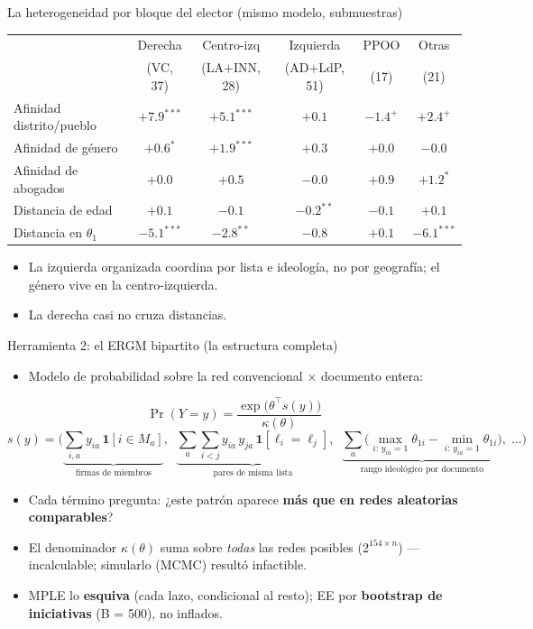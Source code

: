 \documentclass[aspectratio=169,11pt]{beamer}
\newcommand{\emphr}[1]{{\color{ndreddark}\textbf{#1}}}
\begin{document}
\begin{frame}{La heterogeneidad por bloque del elector (mismo modelo, submuestras)}
\begin{center}\footnotesize
\begin{tabular}{lccccc}
\toprule
 & Derecha & Centro-izq & Izquierda & PPOO & Otras \\
 & (VC, 37) & (LA+INN, 28) & (AD+LdP, 51) & (17) & (21) \\
\midrule
Afinidad distrito/pueblo & $+7.9^{***}$ & $+5.1^{***}$ & $+0.1$ & $-1.4^{+}$ & $+2.4^{+}$ \\
Afinidad de género & $+0.6^{*}$ & $+1.9^{***}$ & $+0.3$ & $+0.0$ & $-0.0$ \\
Afinidad de abogados & $+0.0$ & $+0.5$ & $-0.0$ & $+0.9$ & $+1.2^{*}$ \\
Distancia de edad & $+0.1$ & $-0.1$ & $-0.2^{**}$ & $-0.1$ & $+0.1$ \\
Distancia en $\theta_1$ & $-5.1^{***}$ & $-2.8^{**}$ & $-0.8$ & $+0.1$ & $-6.1^{***}$ \\
\bottomrule
\end{tabular}
\end{center}
\vspace{0.25cm}
\begin{itemize}
  \item La izquierda organizada coordina por lista e ideología, no por geografía; el género vive en la centro-izquierda.
  \item La derecha casi no cruza distancias.
\end{itemize}
\end{frame}

\begin{frame}{Herramienta 2: el ERGM bipartito (la estructura completa)}
\begin{itemize}
  \item Modelo de probabilidad sobre la red convencional $\times$ documento entera:
\end{itemize}
$$\Pr(Y = y) = \frac{\exp\big(\theta^\top s(y)\big)}{\kappa(\theta)}$$
{\footnotesize
$$s(y) = \Big(\underbrace{\sum_{i,a} y_{ia}\,\mathbf{1}[i \in M_a]}_{\text{firmas de miembros}},\;\;
\underbrace{\sum_{a}\sum_{i<j} y_{ia}\,y_{ja}\,\mathbf{1}[\ell_i = \ell_j]}_{\text{pares de misma lista}},\;\;
\underbrace{\sum_{a}\big(\max_{i:\,y_{ia}=1}\theta_{1i} - \min_{i:\,y_{ia}=1}\theta_{1i}\big)}_{\text{rango ideológico por documento}},\;\dots\Big)$$}
\begin{itemize}
  \item Cada término pregunta: ¿este patrón aparece \emphr{más que en redes aleatorias comparables}?
  \item El denominador $\kappa(\theta)$ suma sobre \emph{todas} las redes posibles ($2^{154 \times n}$) — incalculable; simularlo (MCMC) resultó infactible.
  \item MPLE lo \emphr{esquiva} (cada lazo, condicional al resto); EE por \emphr{bootstrap de iniciativas} (B = 500), no inflados.
\end{itemize}
\end{frame}
\end{document}
